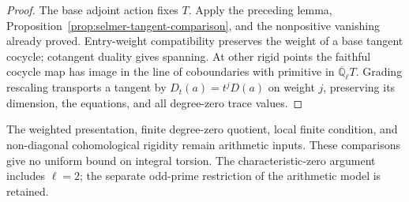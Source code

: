 \begin{proof}
The base adjoint action fixes \(T\). Apply the preceding lemma,
Proposition~\ref{prop:selmer-tangent-comparison}, and the nonpositive
vanishing already proved. Entry-weight compatibility preserves the
weight of a base tangent cocycle; cotangent duality gives spanning. At other
rigid points the faithful cocycle map has image in the line of
coboundaries with primitive in \(\overline{\mathbb Q}_\ell T\).
Grading rescaling transports a tangent by \(D_t(a)=t^jD(a)\)
on weight \(j\), preserving its dimension, the equations, and
all degree-zero trace values.
\end{proof}

The weighted presentation, finite degree-zero quotient,
local finite condition, and non-diagonal cohomological rigidity
remain arithmetic inputs. These comparisons give no uniform bound on
integral torsion. The characteristic-zero argument includes
\(\ell=2\); the separate odd-prime restriction of the arithmetic
model is retained.
